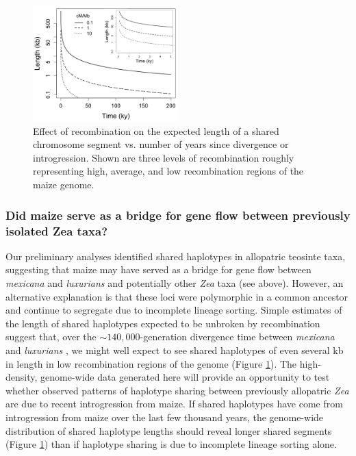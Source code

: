 \begin{figure}
  \centering
   \includegraphics[width=0.5\textwidth]{length_vs_time2}
    \caption{Effect of recombination on the expected length of a shared chromosome segment vs. number of years since divergence or introgression.  Shown are three levels of recombination roughly representing high, average, and low recombination regions of the maize genome.} 
\label{fig:length}
\end{figure}

\subsubsection{Did maize serve as a bridge for gene flow between previously isolated Zea taxa?}
\label{sss:bridge}

Our preliminary analyses identified shared haplotypes in allopatric teosinte taxa, suggesting that maize may have served as a bridge for gene flow between \emph{mexicana} and \emph{luxurians} and potentially other \emph{Zea} taxa (see above).  However, an alternative explanation is that these loci were polymorphic in a common ancestor and continue to segregate due to incomplete lineage sorting.
Simple estimates of the length of shared haplotypes expected to be unbroken by recombination suggest that, over the $\sim 140,000$-generation divergence time between \emph{mexicana} and \emph{luxurians} \citep{Ross-Ibarra2009a}, we might well expect to see shared haplotypes of even several kb in length in low recombination regions of the genome (Figure \ref{fig:length}).
The high-density, genome-wide data generated here will provide an opportunity to test whether observed patterns of haplotype sharing between previously allopatric \emph{Zea} are due to recent introgression from maize.  
If shared haplotypes have come from introgression from maize over the last few thousand years, the genome-wide distribution of shared haplotype lengths should reveal longer shared segments (Figure \ref{fig:length}) than if haplotype sharing is due to incomplete lineage sorting alone.

